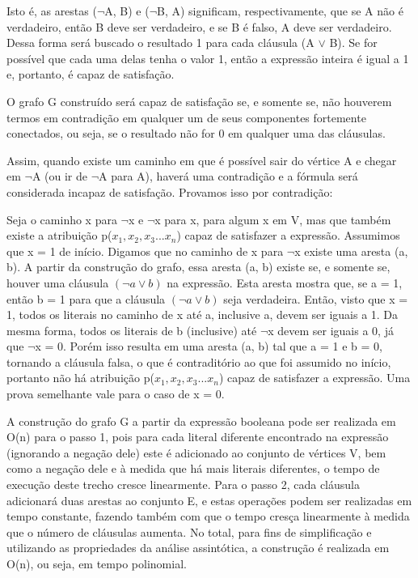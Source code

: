 \documentclass[12pt]{article}
\begin{document}
\begin{enumerate}
{	Isto é, as arestas ($\neg$A, B) e ($\neg$B, A) significam, respectivamente, que se A não é verdadeiro, então B deve ser verdadeiro, e se B é falso, A deve ser verdadeiro. Dessa forma será buscado o resultado 1 para cada cláusula (A $\lor$ B). Se for possível que cada uma delas tenha o valor 1, então a expressão inteira é igual a 1 e, portanto, é capaz de satisfação.
	
	O grafo G construído será capaz de satisfação se, e somente se, não houverem termos em contradição em qualquer um de seus componentes fortemente conectados, ou seja, se o resultado não for 0 em qualquer uma das cláusulas.
	
	Assim, quando existe um caminho em que é possível sair do vértice A e chegar em $\neg$A (ou ir de $\neg$A para A), haverá uma contradição e a fórmula será considerada incapaz de satisfação. Provamos isso por contradição:
	
	Seja o caminho x para $\neg$x e $\neg$x para x, para algum x em V, mas que também existe a atribuição p($x_1, x_2, x_3... x_n$) capaz de satisfazer a expressão. Assumimos que x = 1 de início. Digamos que no caminho de x para $\neg$x existe uma aresta (a, b). A partir da construção do grafo, essa aresta (a, b) existe se, e somente se, houver uma cláusula $(\neg a \lor b)$ na expressão. Esta aresta mostra que, se a = 1, então b = 1 para que a cláusula $(\neg a \lor b)$ seja verdadeira. Então, visto que x = 1, todos os literais no caminho de x até a, inclusive a, devem ser iguais a 1. Da mesma forma, todos os literais de b (inclusive) até $\neg$x devem ser iguais a 0, já que $\neg$x = 0. Porém isso resulta em uma aresta (a, b) tal que a = 1 e b = 0, tornando a cláusula falsa, o que é contraditório ao que foi assumido no início, portanto não há atribuição p($x_1, x_2, x_3... x_n$) capaz de satisfazer a expressão. Uma prova semelhante vale para o caso de x = 0.

    A construção do grafo G a partir da expressão booleana pode ser realizada em O(n) para o passo 1, pois para cada literal diferente encontrado na expressão (ignorando a negação dele) este é adicionado ao conjunto de vértices V, bem como a negação dele e à medida que há mais literais diferentes, o tempo de execução deste trecho cresce linearmente. Para o passo 2, cada cláusula adicionará duas arestas ao conjunto E, e estas operações podem ser realizadas em tempo constante, fazendo também com que o tempo cresça linearmente à medida que o número de cláusulas aumenta. No total, para fins de simplificação e utilizando as propriedades da análise assintótica, a construção é realizada em O(n), ou seja, em tempo polinomial.
    
}
\end{enumerate}
\end{document}
